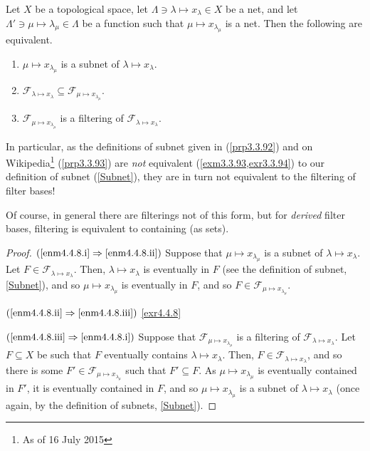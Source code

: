 \begin{prp}\label{prp4.4.8}
Let $X$ be a topological space, let $\Lambda \ni \lambda \mapsto x_\lambda \in X$ be a net, and let $\Lambda '\ni \mu \mapsto \lambda _\mu \in \Lambda$ be a function such that $\mu \mapsto x_{\lambda _\mu}$ is a net.  Then the following are equivalent.
\begin{enumerate}
\item \label{enm4.4.8.i}$\mu \mapsto x_{\lambda _\mu}$ is a subnet of $\lambda \mapsto x_\lambda$.
\item \label{enm4.4.8.ii}$\mathcal{F}_{\lambda \mapsto x_\lambda}\subseteq \mathcal{F}_{\mu \mapsto x_{\lambda _\mu}}$.
\item \label{enm4.4.8.iii}$\mathcal{F}_{\mu \mapsto x_{\lambda _\mu}}$ is a filtering of $\mathcal{F}_{\lambda \mapsto x_\lambda}$.
\end{enumerate}
\begin{rmk}
In particular, as the definitions of subnet given in \cite{Kelley} (\cref{prp3.3.92}) and on Wikipedia\footnote{As of 16 July 2015} (\cref{prp3.3.93}) are \emph{not} equivalent (\cref{exm3.3.93,exr3.3.94}) to our definition of subnet (\cref{Subnet}), they are in turn not equivalent to the filtering of filter bases!
\end{rmk}
\begin{rmk}
Of course, in general there are filterings not of this form, but for \emph{derived} filter bases, filtering is equivalent to containing (as sets).
\end{rmk}
\begin{proof}
$(\ref{enm4.4.8.i}\Rightarrow \ref{enm4.4.8.ii})$ Suppose that $\mu \mapsto x_{\lambda _\mu}$ is a subnet of $\lambda \mapsto x_\lambda$.  Let $F\in \mathcal{F}_{\lambda \mapsto x_\lambda}$.  Then, $\lambda \mapsto x_\lambda$ is eventually in $F$ (see the definition of subnet, \cref{Subnet}), and so $\mu \mapsto x_{\lambda _\mu}$ is eventually in $F$, and so $F\in \mathcal{F}_{\mu \mapsto x_{\lambda _\mu}}$.

$(\ref{enm4.4.8.ii}\Rightarrow \ref{enm4.4.8.iii})$ \cref{exr4.4.8}

$(\ref{enm4.4.8.iii}\Rightarrow \ref{enm4.4.8.i})$
Suppose that $\mathcal{F}_{\mu \mapsto x_{\lambda _\mu}}$ is a filtering of $\mathcal{F}_{\lambda \mapsto x_\lambda}$.  Let $F\subseteq X$ be such that $F$ eventually contains $\lambda \mapsto x_\lambda$.  Then, $F\in \mathcal{F}_{\lambda \mapsto x_\lambda}$, and so there is some $F'\in \mathcal{F}_{\mu \mapsto x_{\lambda _\mu}}$ such that $F'\subseteq F$.  As $\mu \mapsto x_{\lambda _\mu}$ is eventually contained in $F'$, it is eventually contained in $F$, and so $\mu \mapsto x_{\lambda _\mu}$ is a subnet of $\lambda \mapsto x_\lambda$ (once again, by the definition of subnets, \cref{Subnet}).
\end{proof}
\end{prp}

